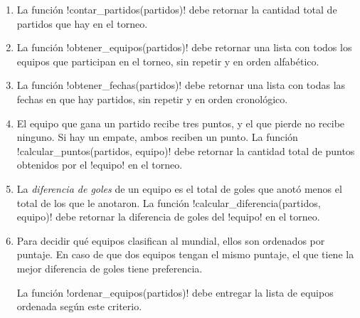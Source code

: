 \documentclass[12pt,spanish]{article}
\begin{document}
  \begin{enumerate}[leftmargin=0pt]

    \item
      La función \li!contar_partidos(partidos)!
      debe retornar la cantidad total de partidos
      que hay en el torneo.
      

    \item
      La función \li!obtener_equipos(partidos)!
      debe retornar una lista con todos los equipos
      que participan en el torneo,
      sin repetir y en orden alfabético.
      

    \item
      La función \li!obtener_fechas(partidos)!
      debe retornar una lista con todas las fechas
      en que hay partidos,
      sin repetir y en orden cronológico.
      

    \item
      El equipo que gana un partido recibe tres puntos,
      y el que pierde no recibe ninguno.
      Si hay un empate,
      ambos reciben un punto.
      La función \li!calcular_puntos(partidos, equipo)!
      debe retornar la cantidad total de puntos
      obtenidos por el \li!equipo! en el torneo.
      

    \item
      La \emph{diferencia de goles} de un equipo
      es el total de goles que anotó
      menos el total de los que le anotaron.
      La función \li!calcular_diferencia(partidos, equipo)!
      debe retornar la diferencia de goles
      del \li!equipo! en el torneo.
      

    \item
      Para decidir qué equipos clasifican al mundial,
      ellos son ordenados por puntaje.
      En caso de que dos equipos tengan el mismo puntaje,
      el que tiene la mejor diferencia de goles tiene preferencia.

      La función \li!ordenar_equipos(partidos)!
      debe entregar la lista de equipos ordenada
      según este criterio.
      


\end{enumerate}
\end{document}
